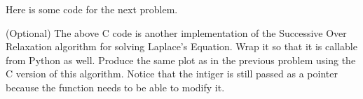 Here is some code for the next problem.

\begin{problem}
(Optional)
The above C code is another implementation of the Successive Over Relaxation algorithm for solving Laplace's Equation.
Wrap it so that it is callable from Python as well.
Produce the same plot as in the previous problem using the C version of this algorithm.
Notice that the intiger  is still passed as a pointer because the function needs to be able to modify it.
\end{problem}


